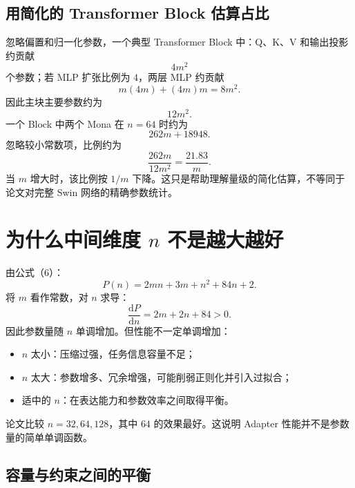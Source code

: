 \documentclass[UTF8,12pt,a4paper,fontset=none]{ctexart}
\begin{document}
\subsection{用简化的 Transformer Block 估算占比}

忽略偏置和归一化参数，一个典型 Transformer Block 中：Q、K、V 和输出投影约贡献
\begin{equation}
 4m^2
\end{equation}
个参数；若 MLP 扩张比例为 $4$，两层 MLP 约贡献
\begin{equation}
 m(4m)+(4m)m=8m^2.
\end{equation}
因此主块主要参数约为
\begin{equation}
 12m^2.
\end{equation}
一个 Block 中两个 Mona 在 $n=64$ 时约为
\begin{equation}
 262m+18948.
\end{equation}
忽略较小常数项，比例约为
\begin{equation}
 \frac{262m}{12m^2}
 =\frac{21.83}{m}.
\end{equation}
当 $m$ 增大时，该比例按 $1/m$ 下降。这只是帮助理解量级的简化估算，不等同于论文对完整 Swin 网络的精确参数统计。

\section{为什么中间维度 \texorpdfstring{$n$}{n} 不是越大越好}

由公式（6）：
\begin{equation}
 P(n)=2mn+3m+n^2+84n+2.
\end{equation}
将 $m$ 看作常数，对 $n$ 求导：
\begin{equation}
 \frac{\mathrm{d}P}{\mathrm{d}n}=2m+2n+84>0.
\end{equation}
因此参数量随 $n$ 单调增加。但性能不一定单调增加：
\begin{itemize}
  \item $n$ 太小：压缩过强，任务信息容量不足；
  \item $n$ 太大：参数增多、冗余增强，可能削弱正则化并引入过拟合；
  \item 适中的 $n$：在表达能力和参数效率之间取得平衡。
\end{itemize}

论文比较 $n=32,64,128$，其中 $64$ 的效果最好。这说明 Adapter 性能并不是参数量的简单单调函数。



\subsection{容量与约束之间的平衡}
\end{document}

